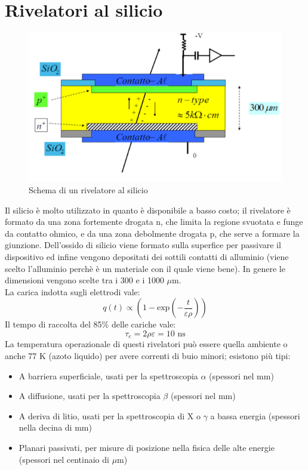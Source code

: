 \section{Rivelatori al silicio}
\begin{figure}[htbp]
\begin{center}
\includegraphics[scale=0.50]{./Immagini/SchemaRivelatoreSilicio.png}
\caption{Schema di un rivelatore al silicio}
\label{fig:schemaRivela49JG8toreSilicio}
\end{center}
\end{figure}
Il silicio \`e molto utilizzato in quanto \`e disponibile a basso costo; il rivelatore \`e formato da una zona fortemente drogata n, che limita
la regione svuotata e funge da contatto ohmico, e da una zona debolmente drogata p, che serve a formare la giunzione.
Dell'ossido di silicio viene formato sulla superfice per passivare il dispositivo ed infine vengono depositati dei sottili contatti di alluminio
(viene scelto l'alluminio perch\`e \`e un materiale con il quale viene bene).
In genere le dimensioni vengono scelte tra i 300 e i 1000 $\mu$m.\\
La carica indotta sugli elettrodi vale:
\begin{equation*}
q(t) \propto \left(1-\text{exp}\left(-\frac{t}{\varepsilon \rho}\right)\right)
\end{equation*}
Il tempo di raccolta del 85\% delle cariche vale:
\begin{equation*}
\tau_e = 2 \rho \varepsilon = 10 \text{ ns}
\end{equation*}
La temperatura operazionale di questi rivelatori pu\`o essere quella ambiente o anche 77 K (azoto liquido) per avere correnti di buio minori;
esistono pi\`u tipi:
\begin{itemize}
\item A barriera superficiale, usati per la spettroscopia $\alpha$ (spessori nel mm)
\item A diffusione, usati per la spettroscopia $\beta$ (spessori nel mm)
\item A deriva di litio, usati per la spettroscopia di X o $\gamma$ a bassa energia (spessori nella decina di mm)
\item Planari passivati, per misure di posizione nella fisica delle alte energie (spessori nel centinaio di $\mu$m)
\end{itemize}
